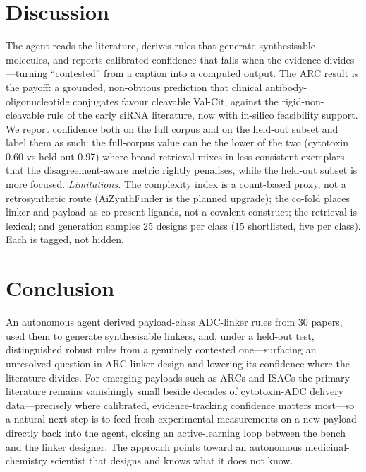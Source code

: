 \documentclass[10pt]{article}
\begin{document}
\section{Discussion}The agent reads the literature, derives rules that generate synthesisable molecules, and reports calibrated confidence that falls when the evidence divides---turning ``contested'' from a caption into a computed output. The ARC result is the payoff: a grounded, non-obvious prediction that clinical antibody-oligonucleotide conjugates favour cleavable Val-Cit, against the rigid-non-cleavable rule of the early siRNA literature, now with in-silico feasibility support. We report confidence both on the full corpus and on the held-out subset and label them as such: the full-corpus value can be the lower of the two (cytotoxin 0.60 vs held-out 0.97) where broad retrieval mixes in less-consistent exemplars that the disagreement-aware metric rightly penalises, while the held-out subset is more focused. \emph{Limitations.} The complexity index is a count-based proxy, not a retrosynthetic route (AiZynthFinder is the planned upgrade); the co-fold places linker and payload as co-present ligands, not a covalent construct; the retrieval is lexical; and generation samples 25 designs per class (15 shortlisted, five per class). Each is tagged, not hidden.
\section{Conclusion}An autonomous agent derived payload-class ADC-linker rules from 30 papers, used them to generate synthesisable linkers, and, under a held-out test, distinguished robust rules from a genuinely contested one---surfacing an unresolved question in ARC linker design and lowering its confidence where the literature divides. For emerging payloads such as ARCs and ISACs the primary literature remains vanishingly small beside decades of cytotoxin-ADC delivery data---precisely where calibrated, evidence-tracking confidence matters most---so a natural next step is to feed fresh experimental measurements on a new payload directly back into the agent, closing an active-learning loop between the bench and the linker designer. The approach points toward an autonomous medicinal-chemistry scientist that designs and knows what it does not know.
\end{document}
